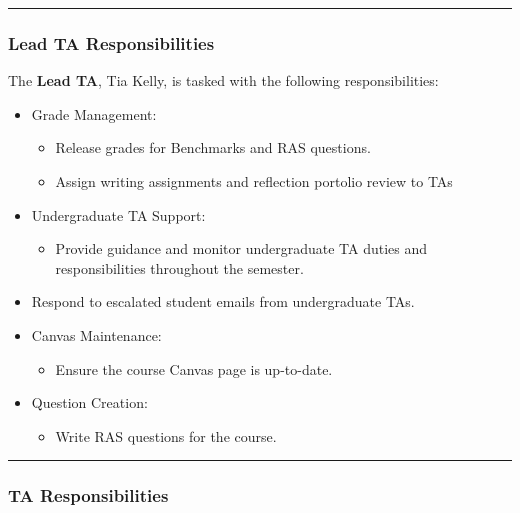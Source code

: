 \documentclass[
]{article}
\providecommand{\tightlist}{%
  \setlength{\itemsep}{0pt}\setlength{\parskip}{0pt}}
\begin{document}
\begin{center}\rule{0.5\linewidth}{0.5pt}\end{center}

\hypertarget{lead-ta-responsibilities}{%
\subsubsection{Lead TA Responsibilities}\label{lead-ta-responsibilities}}

The \textbf{Lead TA}, Tia Kelly, is tasked with the following responsibilities:

\begin{itemize}
\tightlist
\item
  Grade Management:

  \begin{itemize}
  \tightlist
  \item
    Release grades for Benchmarks and RAS questions.
  \item
    Assign writing assignments and reflection portolio review to TAs
  \end{itemize}
\item
  Undergraduate TA Support:

  \begin{itemize}
  \tightlist
  \item
    Provide guidance and monitor undergraduate TA duties and responsibilities throughout the semester.
  \end{itemize}
\item
  Respond to escalated student emails from undergraduate TAs.
\item
  Canvas Maintenance:

  \begin{itemize}
  \tightlist
  \item
    Ensure the course Canvas page is up-to-date.
  \end{itemize}
\item
  Question Creation:

  \begin{itemize}
  \tightlist
  \item
    Write RAS questions for the course.
  \end{itemize}
\end{itemize}

\begin{center}\rule{0.5\linewidth}{0.5pt}\end{center}

\hypertarget{ta-responsibilities}{%
\subsubsection{TA Responsibilities}\label{ta-responsibilities}}
\end{document}
